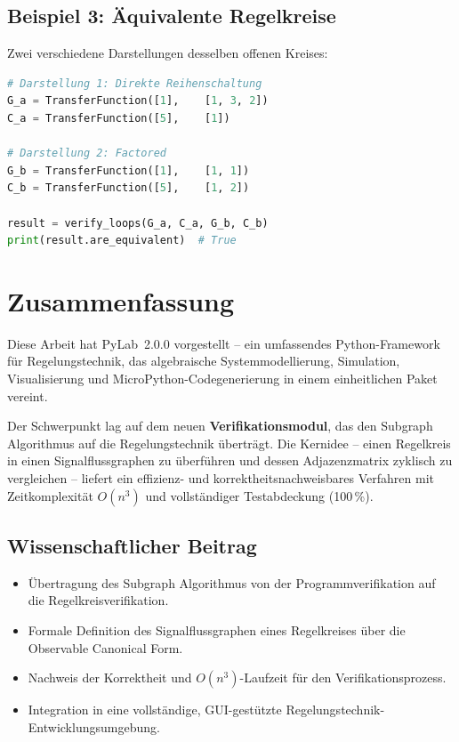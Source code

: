 \documentclass[a4paper,12pt]{article}
\theoremstyle{definition}
\begin{document}
\subsection{Beispiel 3: Äquivalente Regelkreise}

Zwei verschiedene Darstellungen desselben offenen Kreises:

\begin{lstlisting}[language=Python, caption=Äquivalenznachweis zweier Regelkreise]
# Darstellung 1: Direkte Reihenschaltung
G_a = TransferFunction([1],    [1, 3, 2])
C_a = TransferFunction([5],    [1])

# Darstellung 2: Factored
G_b = TransferFunction([1],    [1, 1])
C_b = TransferFunction([5],    [1, 2])

result = verify_loops(G_a, C_a, G_b, C_b)
print(result.are_equivalent)  # True
\end{lstlisting}

\section{Zusammenfassung}
\label{sec:fazit}

Diese Arbeit hat PyLab~2.0.0 vorgestellt -- ein umfassendes Python-Framework
für Regelungstechnik, das algebraische Systemmodellierung, Simulation,
Visualisierung und MicroPython-Codegenerierung in einem einheitlichen Paket
vereint.

Der Schwerpunkt lag auf dem neuen \textbf{Verifikationsmodul}, das den
Subgraph Algorithmus auf die Regelungstechnik überträgt. Die Kernidee -- einen
Regelkreis in einen Signalflussgraphen zu überführen und dessen Adjazenzmatrix
zyklisch zu vergleichen -- liefert ein effizienz- und korrektheitsnachweisbares
Verfahren mit Zeitkomplexität $O(n^3)$ und vollständiger Testabdeckung (100\,\%).

\subsection{Wissenschaftlicher Beitrag}

\begin{itemize}
    \item Übertragung des Subgraph Algorithmus von der Programmverifikation
          auf die Regelkreisverifikation.
    \item Formale Definition des Signalflussgraphen eines Regelkreises
          über die Observable Canonical Form.
    \item Nachweis der Korrektheit und $O(n^3)$-Laufzeit für den
          Verifikationsprozess.
    \item Integration in eine vollständige, GUI-gestützte
          Regelungstechnik-Entwicklungsumge\-bung.
\end{itemize}
\end{document}
